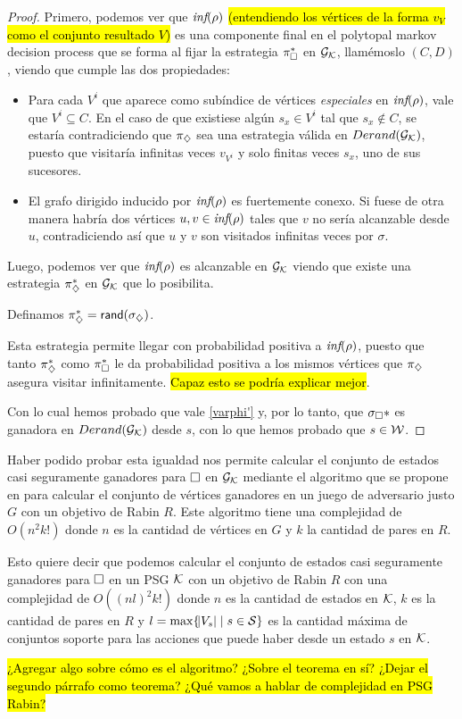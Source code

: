 \begin{proof}
	Primero, podemos ver que $\textit{inf}(\rho)$ \hl{(entendiendo los vértices de la
		forma $v_V$ como el conjunto resultado $V$)} es una componente final en el
	polytopal markov decision process que se forma al fijar la estrategia
	$\pi_\square^*$ en $\mathcal{G}_{\mathcal{K}}$, llamémoslo $(C,D)$, viendo que cumple las dos
	propiedades:

	\begin{itemize}
		\item Para cada $V^i$ que aparece como subíndice de vértices \textit{especiales} en
		      $\textit{inf}(\rho)$, vale que $V^i \subseteq C$. En el caso de que existiese algún
		      $s_x \in V^i$ tal que $s_x \notin C$, se estaría contradiciendo que $\pi_\diamondsuit$
		      sea una estrategia válida en $Derand(\mathcal{G}_{\mathcal{K}})$, puesto que visitaría infinitas veces
		      $v_{V^i}$ y solo finitas veces $s_x$, uno de sus sucesores.
		\item El grafo dirigido inducido por $\textit{inf}(\rho)$ es fuertemente conexo. Si fuese de
		      otra manera habría dos vértices $u, v \in \textit{inf}(\rho)$ tales que $v$ no sería
		      alcanzable desde $u$, contradiciendo así que $u$ y $v$ son visitados infinitas
		      veces por $\sigma$.
	\end{itemize}

	Luego, podemos ver que $\textit{inf}(\rho)$ es alcanzable en $\mathcal{G}_{\mathcal{K}}$ viendo que existe
	una estrategia $\pi_\diamondsuit^*$ en $\mathcal{G}_{\mathcal{K}}$ que lo posibilita.

	Definamos $\pi_\diamondsuit^* = \textsf{rand}(\sigma_\diamondsuit)$.

	Esta estrategia permite llegar con probabilidad positiva a $\textit{inf}(\rho)$,
	puesto que tanto $\pi_\diamondsuit^*$ como $\pi_\square^*$ le da probabilidad positiva a los
	mismos vértices que $\pi_\diamondsuit$ asegura visitar infinitamente. \hl{Capaz esto se
		podría explicar mejor}.

	Con lo cual hemos probado que vale \ref{varphi'} y, por lo tanto, que
	$\sigma_\square*$ es ganadora en $Derand(\mathcal{G}_{\mathcal{K}})$ desde $s$, con lo que hemos probado que
	$s \in \mathcal{W}$.

\end{proof}

Haber podido probar esta igualdad nos permite calcular el conjunto de estados
casi seguramente ganadores para $\square$ en $\mathcal{G}_{\mathcal{K}}$ mediante el algoritmo que se
propone en \cite{Banerjee} para calcular el conjunto de vértices ganadores en
un juego de adversario justo $G$ con un objetivo de Rabin $R$. Este algoritmo
tiene una complejidad de $O(n^2 k!)$ donde $n$ es la cantidad de vértices en
$G$ y $k$ la cantidad de pares en $R$.

Esto quiere decir que podemos calcular el conjunto de estados casi seguramente
ganadores para $\square$ en un PSG $\mathcal{K}$ con un objetivo de Rabin $R$ con una
complejidad de $O((n l)^2 k! )$ donde $n$ es la cantidad de estados en $\mathcal{K}$,
$k$ es la cantidad de pares en $R$ y $l = \max \{\abs{V_s} \mid s \in \mathcal{S} \}$
es la cantidad máxima de conjuntos soporte para las acciones que puede haber
desde un estado $s$ en $\mathcal{K}$.

\hl{¿Agregar algo sobre cómo es el algoritmo? ¿Sobre el teorema en sí? ¿Dejar el segundo párrafo como teorema? ¿Qué vamos a hablar de complejidad en PSG Rabin?}